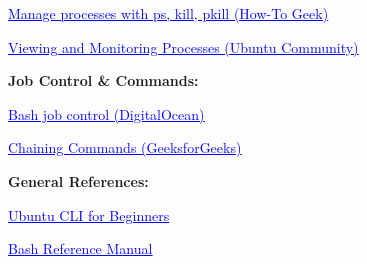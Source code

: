 \documentclass[
  english,
  paper=a4,
  oneside  ,captions=tableheading
]{scrartcl}
\begin{document}
%
  \par\vspace{0.5ex}%
  \href{https://www.howtogeek.com/how-to-manage-linux-processes-using-ps-kill-and-pkill/}{\textcolor{blue}{\underline{\faLink\quad Manage processes with ps, kill, pkill (How-To Geek)}}}%
  \par\vspace{0.5ex}%

%
  \par\vspace{0.5ex}%
  \href{https://discourse.ubuntu.com/t/viewing-and-monitoring-processes-in-linux/26024}{\textcolor{blue}{\underline{\faLink\quad Viewing and Monitoring Processes (Ubuntu Community)}}}%
  \par\vspace{0.5ex}%

\textbf{Job Control \& Commands:}

%
  \par\vspace{0.5ex}%
  \href{https://www.digitalocean.com/community/tutorials/how-to-use-bash-s-job-control-to-manage-foreground-and-background-processes}{\textcolor{blue}{\underline{\faLink\quad Bash job control (DigitalOcean)}}}%
  \par\vspace{0.5ex}%

%
  \par\vspace{0.5ex}%
  \href{https://www.geeksforgeeks.org/linux-unix/chaining-commands-in-linux/}{\textcolor{blue}{\underline{\faLink\quad Chaining Commands (GeeksforGeeks)}}}%
  \par\vspace{0.5ex}%

\textbf{General References:}

%
  \par\vspace{0.5ex}%
  \href{https://ubuntu.com/tutorials/command-line-for-beginners}{\textcolor{blue}{\underline{\faLink\quad Ubuntu CLI for Beginners}}}%
  \par\vspace{0.5ex}%

%
  \par\vspace{0.5ex}%
  \href{https://www.gnu.org/software/bash/manual/}{\textcolor{blue}{\underline{\faLink\quad Bash Reference Manual}}}%
  \par\vspace{0.5ex}%
\end{document}
